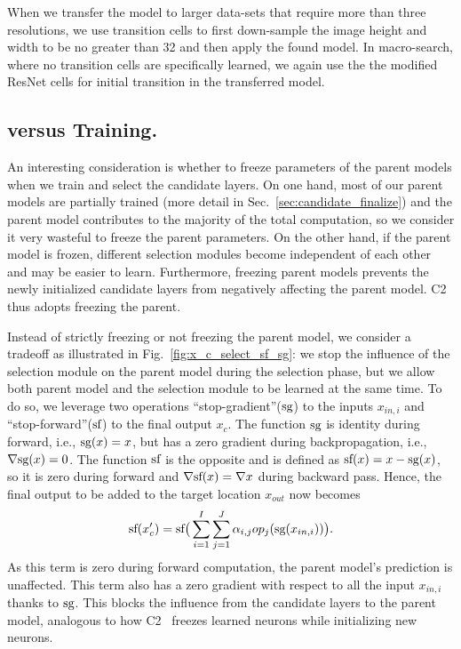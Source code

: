 When we transfer the model to larger data-sets that require more than three resolutions, we use transition cells to first down-sample the image height and width to be no greater than 32 and then apply the found model. In macro-search, where no transition cells are specifically learned, we again use the the modified ResNet cells for initial transition in the transferred model.

\subsection{\petridishhard versus \petridishsoft Training.}
\label{sec:soft_vs_hard}
An interesting consideration is whether to freeze parameters of the parent models when we train and select the candidate layers. On one hand, most of our parent models are partially trained (more detail in Sec.~\ref{sec:candidate_finalize}) and the parent model contributes to the majority of the total computation, so we consider it very wasteful to freeze the parent parameters. On the other hand, if the parent model is frozen, different selection modules become independent of each other and may be easier to learn. Furthermore, freezing parent models prevents the newly initialized candidate layers from negatively affecting the parent model. C2~\citep{cascadecorr} thus adopts freezing the parent. 

Instead of strictly freezing or not freezing the parent model, we consider a tradeoff as illustrated in Fig.~\ref{fig:x_c_select_sf_sg}: we stop the influence of the selection module on the parent model during the selection phase, but we allow both parent model and the selection module to be learned at the same time. To do so, we leverage two operations ``stop-gradient''($\textrm{sg}$) to the inputs $x_{in,i}$ and ``stop-forward''($\textrm{sf}$) to the final output $x_c$. The function $\textrm{sg}$ is identity during forward, i.e., $\textrm{sg} (x) = x$, but has a zero gradient during backpropagation, i.e., $\nabla \textrm{sg}(x) = 0$. The function $\textrm{sf}$ is the opposite and is defined as $\textrm{sf} (x) = x - \textrm{sg} (x)$, so it is zero during forward and $\nabla \textrm{sf} (x) = \nabla x$ during backward pass.  
Hence, the final output to be added to the target location $x_{out}$ now becomes 
\begin{align}
    \textrm{sf} (x'_c) =  \textrm{sf} \big(\sum _{i=1}^I \sum_{j=1}^J \alpha_{i,j} op_j( \textrm{sg}( x_{in,i} ) ) \big). 
    \label{eq:x_c_select_sf_sg}
\end{align}
As this term is zero during forward computation, the parent model's prediction is unaffected. This term also has a zero gradient with respect to all the input $x_{in,i}$ thanks to $\textrm{sg}$. This blocks the influence from the candidate layers to the parent model, analogous to how C2~\citep{cascadecorr} freezes learned neurons while initializing new neurons. 

